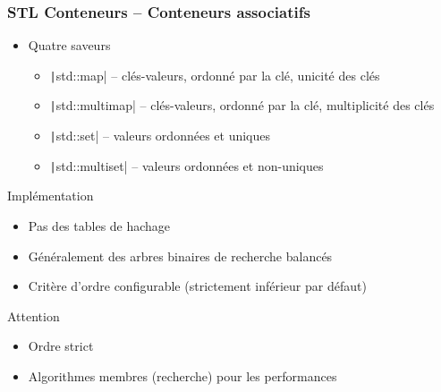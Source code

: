 \documentclass[C++.tex]{subfiles}
\begin{document}
\begin{frame}[fragile]
	\frametitle{STL Conteneurs -- Conteneurs associatifs}
	\begin{itemize}
		\item Quatre saveurs
		\begin{itemize}
			\item \texttt|std::map| -- clés-valeurs, ordonné par la clé, unicité des clés
			\item \texttt|std::multimap| -- clés-valeurs, ordonné par la clé, multiplicité des clés
			\item \texttt|std::set| -- valeurs ordonnées et uniques
			\item \texttt|std::multiset| -- valeurs ordonnées et non-uniques
		\end{itemize}
	\end{itemize}

	\begin{block}{Implémentation}
		\begin{itemize}
			\item Pas des tables de hachage
			\item Généralement des arbres binaires de recherche balancés
		\end{itemize}

	\end{block}

	\begin{itemize}
		\item Critère d'ordre configurable (strictement inférieur par défaut)
	\end{itemize}

	\begin{alertblock}{Attention}
		\begin{itemize}
			\item Ordre strict
		\end{itemize}
	\end{alertblock}

	\begin{itemize}
		\item Algorithmes membres (recherche) pour les performances
	\end{itemize}
\end{frame}
\end{document}

